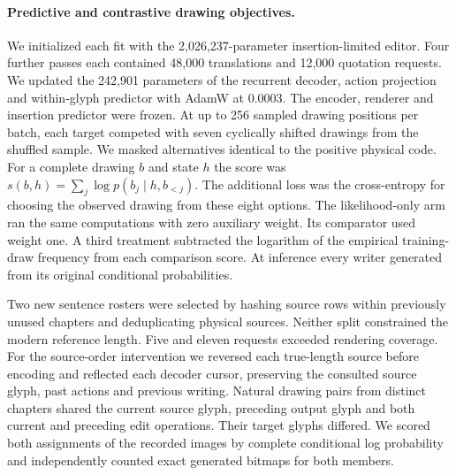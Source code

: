 \paragraph{Predictive and contrastive drawing objectives.}
We initialized each fit with the 2,026,237-parameter insertion-limited editor. Four further passes each contained 48,000 translations and 12,000 quotation requests. We updated the 242,901 parameters of the recurrent decoder, action projection and within-glyph predictor with AdamW at 0.0003. The encoder, renderer and insertion predictor were frozen. At up to 256 sampled drawing positions per batch, each target competed with seven cyclically shifted drawings from the shuffled sample. We masked alternatives identical to the positive physical code. For a complete drawing $b$ and state $h$ the score was $s(b,h)=\sum_j\log p(b_j\mid h,b_{<j})$. The additional loss was the cross-entropy for choosing the observed drawing from these eight options. The likelihood-only arm ran the same computations with zero auxiliary weight. Its comparator used weight one. A third treatment subtracted the logarithm of the empirical training-draw frequency from each comparison score. At inference every writer generated from its original conditional probabilities.

Two new sentence rosters were selected by hashing source rows within previously unused chapters and deduplicating physical sources. Neither split constrained the modern reference length. Five and eleven requests exceeded rendering coverage. For the source-order intervention we reversed each true-length source before encoding and reflected each decoder cursor, preserving the consulted source glyph, past actions and previous writing. Natural drawing pairs from distinct chapters shared the current source glyph, preceding output glyph and both current and preceding edit operations. Their target glyphs differed. We scored both assignments of the recorded images by complete conditional log probability and independently counted exact generated bitmaps for both members.
